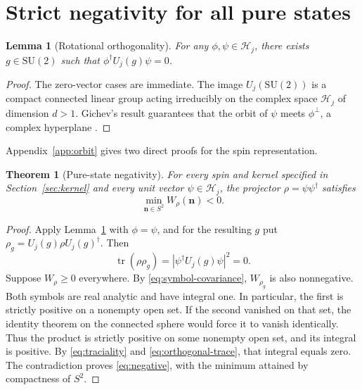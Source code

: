 \documentclass[11pt,a4paper]{article}
\newtheorem{theorem}{Theorem}
\newtheorem{lemma}{Lemma}
\DeclareMathOperator{\tr}{tr}
\newcommand{\SU}{\mathrm{SU}}
\newcommand{\vn}{\mathbf n}
\begin{document}
\section{Strict negativity for all pure states}

\begin{lemma}[Rotational orthogonality]\label{lem:orbit}
For any \(\phi,\psi\in\mathcal H_j\), there exists \(g\in\SU(2)\)
such that \(\phi^\dagger U_j(g)\psi=0\).
\end{lemma}

\begin{proof}
The zero-vector cases are immediate. The image \(U_j(\SU(2))\)
is a compact connected linear group acting irreducibly on the
complex space \(\mathcal H_j\) of dimension \(d>1\).
Gichev's result guarantees that the orbit of \(\psi\) meets
\(\phi^\perp\), a complex hyperplane \cite[Corollary~1]{gichev2004}.
\end{proof}

Appendix~\ref{app:orbit} gives two direct proofs for the spin representation.

\begin{theorem}[Pure-state negativity]\label{thm:negative}
For every spin and kernel specified in Section~\ref{sec:kernel} and
every unit vector \(\psi\in\mathcal H_j\), the projector
\(\rho=\psi\psi^\dagger\) satisfies
\begin{equation}
  \min_{\vn\in S^2}W_\rho(\vn)<0 .
  \label{eq:negative}
\end{equation}
\end{theorem}

\begin{proof}
Apply Lemma~\ref{lem:orbit} with \(\phi=\psi\), and for the resulting
\(g\) put \(\rho_g=U_j(g)\rho U_j(g)^\dagger\). Then
\begin{equation}
  \tr(\rho\rho_g)=|\psi^\dagger U_j(g)\psi|^2=0 .
  \label{eq:orthogonal-trace}
\end{equation}
Suppose \(W_\rho\geq 0\) everywhere. By
\eqref{eq:symbol-covariance}, \(W_{\rho_g}\) is also nonnegative.
Both symbols are real analytic and have integral one. In particular,
the first is strictly positive on a nonempty open set. If the second
vanished on that set, the identity theorem on the connected sphere
would force it to vanish identically. Thus the product is strictly
positive on some nonempty open set, and its integral is positive.
By \eqref{eq:traciality} and \eqref{eq:orthogonal-trace}, that integral
equals zero. The contradiction proves \eqref{eq:negative}, with the
minimum attained by compactness of \(S^2\).
\end{proof}
\end{document}
